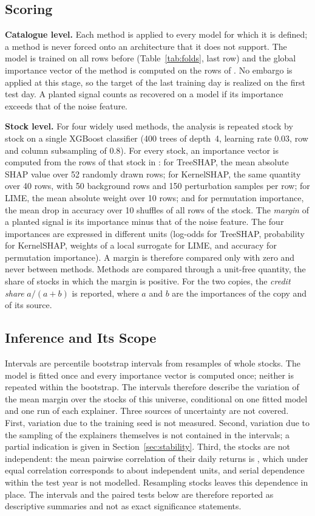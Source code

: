 \documentclass[conference]{IEEEtran}
\begin{document}
\subsection{Scoring}
\label{sec:scoring}
\textbf{Catalogue level.} Each method is applied to every model for which it
is defined; a method is never forced onto an architecture that it does not
support. The model is trained on all rows before \scoreYear{}
(Table~\ref{tab:folds}, last row) and the global importance vector of the
method is computed on the rows of \scoreYear. No embargo is applied at this
stage, so the target of the last training day is realized on the first test
day. A planted signal counts as recovered on a model if its importance
exceeds that of the noise feature.

\textbf{Stock level.} For four widely used methods, the analysis is repeated
stock by stock on a single XGBoost classifier (400 trees of depth~4,
learning rate 0.03, row and column subsampling of 0.8). For every stock, an
importance vector is computed from the rows of that stock in \scoreYear:
for TreeSHAP, the mean absolute SHAP value over 52 randomly drawn rows; for
KernelSHAP, the same quantity over 40 rows, with 50 background rows and 150
perturbation samples per row; for LIME, the mean absolute weight over 10
rows; and for permutation importance, the mean drop in accuracy over 10
shuffles of all rows of the stock. The \emph{margin} of a planted signal is
its importance minus that of the noise feature. The four importances are
expressed in different units (log-odds for TreeSHAP, probability for
KernelSHAP, weights of a local surrogate for LIME, and accuracy for
permutation importance). A margin is therefore compared only with zero and
never between methods. Methods are compared through a unit-free quantity,
the share of stocks in which the margin is positive. For the two copies, the
\emph{credit share} $a/(a+b)$ is reported, where $a$ and $b$ are the
importances of the copy and of its source.

\subsection{Inference and Its Scope}
\label{sec:inference}
Intervals are percentile bootstrap intervals from \nBootstrap{} resamples of
whole stocks. The model is fitted once and every importance vector is
computed once; neither is repeated within the bootstrap. The intervals
therefore describe the variation of the mean margin over the stocks of this
universe, conditional on one fitted model and one run of each explainer.
Three sources of uncertainty are not covered. First, variation due to the
training seed is not measured. Second, variation due to the sampling of the
explainers themselves is not contained in the intervals; a partial
indication is given in Section~\ref{sec:stability}. Third, the stocks are
not independent: the mean pairwise correlation of their daily returns is
\faithRhoBar, which under equal correlation corresponds to about \faithEffN{}
independent units, and serial dependence within the test year is not
modelled. Resampling stocks leaves this dependence in place. The intervals
and the paired tests below are therefore reported as descriptive summaries
and not as exact significance statements.
\end{document}
